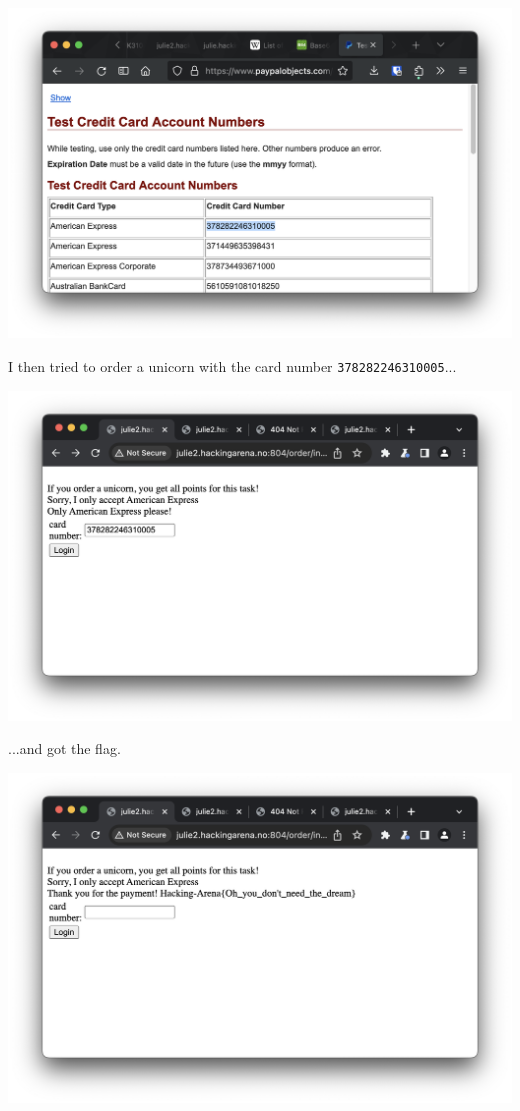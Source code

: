 \begin{center}
    \includegraphics[width=15cm]{img/Web hacking/Order a Unicorn/Screenshot 2023-11-24 at 12.55.43.png}
\end{center}

I then tried to order a unicorn with the card number \texttt{378282246310005}...

\begin{center}
    \includegraphics[width=15cm]{img/Web hacking/Order a Unicorn/Screenshot 2023-11-24 at 12.55.22.png}
\end{center}

...and got the flag.

\begin{center}
    \includegraphics[width=15cm]{img/Web hacking/Order a Unicorn/Screenshot 2023-11-24 at 12.55.26.png}
\end{center}